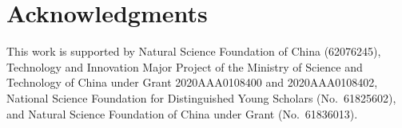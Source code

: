 \section{Acknowledgments}
This work is supported by Natural Science Foundation of China (62076245), Technology and Innovation Major Project of the Ministry of Science and Technology of China under Grant 2020AAA0108400 and 2020AAA0108402, National Science Foundation for Distinguished Young Scholars
(No.~61825602), and Natural Science Foundation of China under Grant (No.~61836013).
